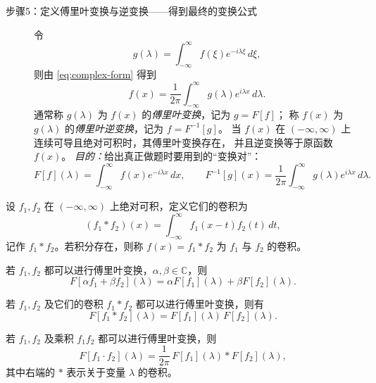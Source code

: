 \begin{description}
  \item[步骤5：定义傅里叶变换与逆变换——得到最终的变换公式]
  令
  \begin{equation}\label{eq:FT}
    g(\lambda)=\int_{-\infty}^{\infty}f(\xi)e^{-i\lambda\xi}\,d\xi, \tag{3.5}
  \end{equation}
  则由 \eqref{eq:complex-form} 得到
  \begin{equation}\label{eq:IFT}
    f(x)=\frac{1}{2\pi}\int_{-\infty}^{\infty}g(\lambda)e^{i\lambda x}\,d\lambda. \tag{3.6}
  \end{equation}
  通常称 $g(\lambda)$ 为 $f(x)$ 的\emph{傅里叶变换}，记为 $g=F[f]$；
  称 $f(x)$ 为 $g(\lambda)$ 的\emph{傅里叶逆变换}，记为 $f=F^{-1}[g]$。
  当 $f(x)$ 在 $(-\infty,\infty)$ 上连续可导且绝对可积时，其傅里叶变换存在，
  并且逆变换等于原函数 $f(x)$。
  \emph{目的：}给出真正做题时要用到的“变换对”：
  \[
    F[f](\lambda)=\int_{-\infty}^{\infty}f(x)e^{-i\lambda x}\,dx,\qquad
    F^{-1}[g](x)=\frac{1}{2\pi}\int_{-\infty}^{\infty}g(\lambda)e^{i\lambda x}\,d\lambda.
  \]
\end{description}
\begin{definition}
设 $f_1,f_2$ 在 $(-\infty,\infty)$ 上绝对可积，定义它们的卷积为
\[
  (f_1*f_2)(x)=\int_{-\infty}^{\infty} f_1(x-t)f_2(t)\,dt,
\]
记作 $f_1*f_2$。若积分存在，则称 $f(x)=f_1*f_2$ 为 $f_1$ 与 $f_2$ 的卷积。
\end{definition}

\begin{theorem}\label{thm:FT-linearity}
若 $f_1,f_2$ 都可以进行傅里叶变换，$\alpha,\beta\in\mathbb{C}$，则
\[
  F[\alpha f_1+\beta f_2](\lambda)
  =\alpha F[f_1](\lambda)+\beta F[f_2](\lambda).
\]
\end{theorem}

\begin{theorem}\label{thm:FT-convolution}
若 $f_1,f_2$ 及它们的卷积 $f_1*f_2$ 都可以进行傅里叶变换，则有
\[
  F[f_1*f_2](\lambda)=F[f_1](\lambda)\,F[f_2](\lambda).
\]
\end{theorem}

\begin{theorem}\label{thm:FT-product}
若 $f_1,f_2$ 及乘积 $f_1f_2$ 都可以进行傅里叶变换，则
\[
  F[f_1\cdot f_2](\lambda)
  =\frac{1}{2\pi}\,F[f_1](\lambda)*F[f_2](\lambda),
\]
其中右端的 $*$ 表示关于变量 $\lambda$ 的卷积。
\end{theorem}

